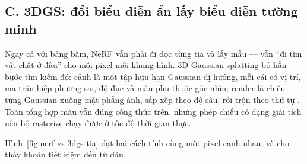 \documentclass[../../../deep_learning.tex]{subfiles}
\begin{document}
\subsection{C. 3DGS: đổi biểu diễn ẩn lấy biểu diễn tường minh}
Ngay cả với bảng băm, NeRF vẫn phải đi dọc từng tia và lấy mẫu --- vẫn ``đi tìm vật chất ở đâu'' cho mỗi pixel mỗi khung hình. 3D Gaussian splatting bỏ hẳn bước tìm kiếm đó: cảnh là một tập hữu hạn Gaussian dị hướng, mỗi cái có vị trí, ma trận hiệp phương sai, độ đục và màu phụ thuộc góc nhìn; render là chiếu từng Gaussian xuống mặt phẳng ảnh, sắp xếp theo độ sâu, rồi trộn theo thứ tự \cite{kerbl20233dgs}. Toán tổng hợp màu vẫn đúng công thức trên, nhưng phép chiếu có dạng giải tích nên bộ rasterize chạy được ở tốc độ thời gian thực.

Hình~\ref{fig:nerf-vs-3dgs-tia} đặt hai cách tính cùng một pixel cạnh nhau, và cho thấy khoản tiết kiệm đến từ đâu.
\end{document}
